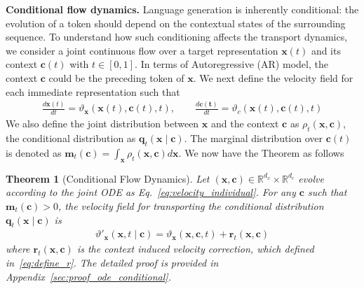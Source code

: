 \documentclass{article} %
\newtheorem{theorem}{Theorem}
\begin{document}
\textbf{Conditional flow dynamics.} Language generation is inherently conditional: the evolution of a token should depend on the contextual states of the surrounding sequence. To understand how such conditioning affects the transport dynamics, we consider a joint continuous flow over a target representation $\mathbf{x}(t)$ and its context $\mathbf{c}(t)$ with $t \in [0,1]$. In terms of Autoregressive (AR) model, the context $\mathbf{c}$ could be the preceding token of $\mathbf{x}$. We next define the velocity field for each immediate representation such that 
\begin{eqnarray}
\frac{d \mathbf{x}(t)}{dt} = \vartheta_{\mathbf{x}}(\mathbf{x}(t), \mathbf{c}(t), t), \quad \quad \frac{d \mathbf{c(t)}}{dt} = \vartheta_{c} (\mathbf{x}(t), \mathbf{c}(t), t) \label{eq:velocity_individual}
\end{eqnarray}
We also define the joint distribution between $\mathbf{x}$ and the context $\mathbf{c}$ as $\rho_{t}(\mathbf{x}, \mathbf{c})$, the conditional distribution as $\mathbf{q}_t (\mathbf{x} \mid \mathbf{c})$. The marginal distribution over $\mathbf{c}(t)$ is denoted as $\mathbf{m}_t(\mathbf{c}) = \int_{\mathbf{x}} \rho_{t}(\mathbf{x}, \mathbf{c}) d \mathbf{x}$. We now have the Theorem as follows

\begin{theorem}[Conditional Flow Dynamics]
\label{thm:conditional_flow}
Let $(\mathbf{x},\mathbf{c})\in\mathbb{R}^{d_x}\times\mathbb{R}^{d_c}$ evolve according to the joint ODE as Eq.~\ref{eq:velocity_individual}. For any $\mathbf{c}$ such that $\mathbf{m}_t(\mathbf{c})>0$, the velocity field for transporting the conditional distribution $\mathbf{q}_t(\mathbf{x}\mid\mathbf{c})$ is 
\begin{eqnarray}
    \vartheta'_{\mathbf{x}}(\mathbf{x},t \mid \mathbf{c}) = \vartheta_{\mathbf{x}}(\mathbf{x}, \mathbf{c}, t) + \mathbf{r}_t (\mathbf{x}, \mathbf{c})
\end{eqnarray}
where $\mathbf{r}_t (\mathbf{x}, \mathbf{c})$ is the context induced velocity correction, which defined in~\ref{eq:define_r}. The detailed proof is provided in Appendix~\ref{sec:proof_ode_conditional}.
\end{theorem}
\end{document}
